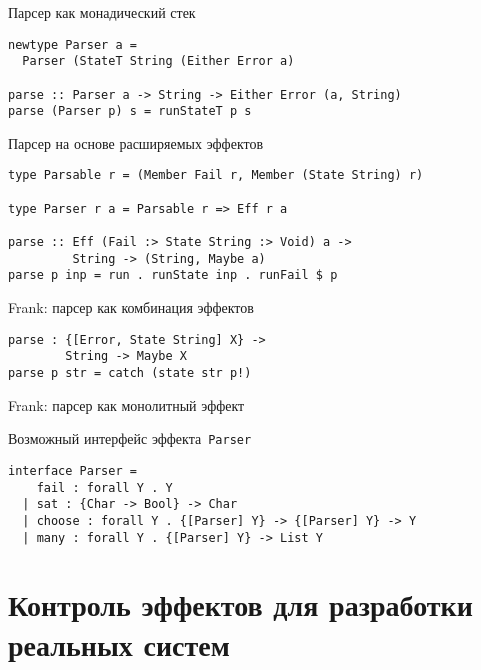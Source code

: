 \begin{frame}[fragile]{Парсер как монадический стек}
\begin{block}{}
\begin{verbatim}
newtype Parser a =
  Parser (StateT String (Either Error a)

parse :: Parser a -> String -> Either Error (a, String)
parse (Parser p) s = runStateT p s
\end{verbatim}
\end{block}
\end{frame}

\begin{frame}[fragile]{Парсер на основе расширяемых эффектов}
\begin{block}{}
\begin{verbatim}
type Parsable r = (Member Fail r, Member (State String) r)

type Parser r a = Parsable r => Eff r a

parse :: Eff (Fail :> State String :> Void) a ->
         String -> (String, Maybe a)
parse p inp = run . runState inp . runFail $ p
\end{verbatim}
\end{block}
\end{frame}

\begin{frame}[fragile]{Frank: парсер как комбинация эффектов}
\begin{block}{}
\begin{verbatim}
parse : {[Error, State String] X} ->
        String -> Maybe X
parse p str = catch (state str p!)
\end{verbatim}
\end{block}
\end{frame}

\begin{frame}[fragile]{Frank: парсер как монолитный эффект}
\begin{block}{Возможный интерфейс эффекта~\texttt{Parser}}
\begin{verbatim}
interface Parser =
    fail : forall Y . Y
  | sat : {Char -> Bool} -> Char
  | choose : forall Y . {[Parser] Y} -> {[Parser] Y} -> Y
  | many : forall Y . {[Parser] Y} -> List Y
\end{verbatim}
\end{block}
\end{frame}

\section{Контроль эффектов для разработки реальных систем}

